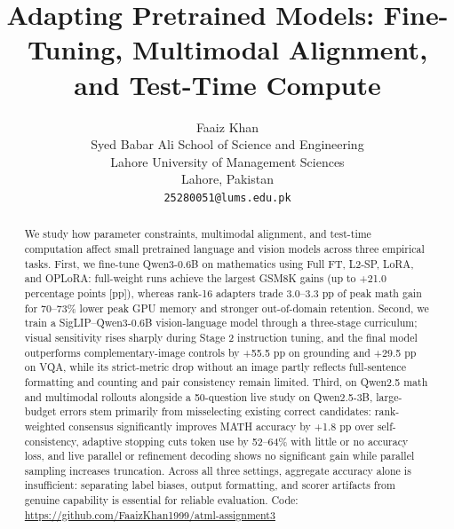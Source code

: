 \documentclass{article}
\title{Adapting Pretrained Models: Fine-Tuning, Multimodal Alignment, and Test-Time Compute}
\author{
  Faaiz Khan \\
  Syed Babar Ali School of Science and Engineering\\
  Lahore University of Management Sciences\\
  Lahore, Pakistan\\
  \texttt{25280051@lums.edu.pk} \\
}
\begin{document}
\maketitle
\suppressfloats[t]   %

\begin{abstract}
  We study how parameter constraints, multimodal alignment, and test-time computation affect small pretrained language and vision models across three empirical tasks. First, we fine-tune Qwen3-0.6B on mathematics using Full FT, L2-SP, LoRA, and OPLoRA: full-weight runs achieve the largest GSM8K gains (up to +21.0 percentage points [pp]), whereas rank-16 adapters trade 3.0--3.3 pp of peak math gain for 70--73\% lower peak GPU memory and stronger out-of-domain retention. Second, we train a SigLIP--Qwen3-0.6B vision-language model through a three-stage curriculum; visual sensitivity rises sharply during Stage 2 instruction tuning, and the final model outperforms complementary-image controls by +55.5 pp on grounding and +29.5 pp on VQA, while its strict-metric drop without an image partly reflects full-sentence formatting and counting and pair consistency remain limited. Third, on Qwen2.5 math and multimodal rollouts alongside a 50-question live study on Qwen2.5-3B, large-budget errors stem primarily from misselecting existing correct candidates: rank-weighted consensus significantly improves MATH accuracy by +1.8 pp over self-consistency, adaptive stopping cuts token use by 52--64\% with little or no accuracy loss, and live parallel or refinement decoding shows no significant gain while parallel sampling increases truncation. Across all three settings, aggregate accuracy alone is insufficient: separating label biases, output formatting, and scorer artifacts from genuine capability is essential for reliable evaluation. Code: \url{https://github.com/FaaizKhan1999/atml-assignment3}
\end{abstract}
\end{document}
